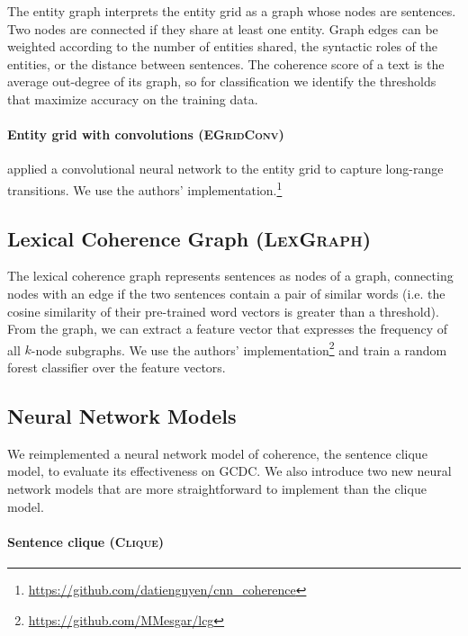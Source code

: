 \documentclass[11pt,a4paper]{article}
\newcommand \lexgraph{\textsc{LexGraph}\xspace}
\newcommand \clique{\textsc{Clique}\xspace}
\newcommand \egridconv{\textsc{EGridConv}\xspace}
\newcommand \dataset{\textsc{GCDC}\xspace}
\begin{document}
The entity graph \cite{guinaudeau-strube:2013:ACL2013} interprets the entity grid as a graph whose nodes are sentences. Two nodes are connected if they share at least one entity. Graph edges can be weighted according to the number of entities shared, the syntactic roles of the entities, or the distance between sentences. The coherence score of a text is the average out-degree of its graph, so for classification we identify the thresholds that maximize accuracy on the training data.

\paragraph{Entity grid with convolutions (\egridconv)}

\citet{nguyen-joty:2017:ACL} applied a convolutional neural network to the entity grid to capture long-range transitions. We use the authors' implementation.\footnote{\url{https://github.com/datienguyen/cnn_coherence}}


\subsection{Lexical Coherence Graph (\lexgraph)}

The lexical coherence graph \cite{mesgar-strube:2016} represents sentences as nodes of a graph, connecting nodes with an edge if the two sentences contain a pair of similar words (i.e. the cosine similarity of their pre-trained word vectors is greater than a threshold). From the graph, we can extract a feature vector that expresses the frequency of all $k$-node subgraphs. We use the authors' implementation\footnote{\url{https://github.com/MMesgar/lcg}} and train a random forest classifier over the feature vectors. 


\subsection{Neural Network Models}

We reimplemented a neural network model of coherence, the sentence clique model, to evaluate its effectiveness on \dataset. We also introduce two new neural network models that are more straightforward to implement than the clique model. 

\paragraph{Sentence clique (\clique)}
\end{document}
